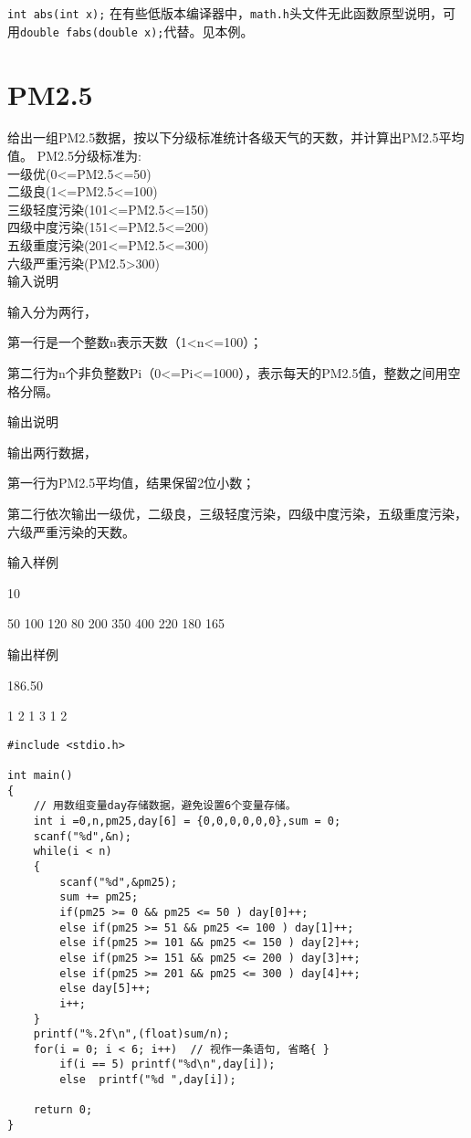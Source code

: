 \begin{note}[整数求绝对值函数]
	\lstinline|int abs(int x);| 在有些低版本编译器中，\lstinline|math.h|头文件无此函数原型说明，可用\lstinline|double fabs(double x);|代替。见本例。
\end{note}

\section{PM2.5}
给出一组PM2.5数据，按以下分级标准统计各级天气的天数，并计算出PM2.5平均值。
PM2.5分级标准为:\\
一级优(0<=PM2.5<=50)\\
二级良(1<=PM2.5<=100)\\
三级轻度污染(101<=PM2.5<=150)\\
四级中度污染(151<=PM2.5<=200)\\
五级重度污染(201<=PM2.5<=300)\\
六级严重污染(PM2.5>300)\\

输入说明
	
输入分为两行，

第一行是一个整数n表示天数（1<n<=100）；

第二行为n个非负整数Pi（0<=Pi<=1000），表示每天的PM2.5值，整数之间用空格分隔。

输出说明
	
输出两行数据，

第一行为PM2.5平均值，结果保留2位小数；

第二行依次输出一级优，二级良，三级轻度污染，四级中度污染，五级重度污染，六级严重污染的天数。

输入样例
	
10

50 100 120 80 200 350 400 220 180 165

输出样例	

186.50

1 2 1 3 1 2

\begin{lstlisting}
#include <stdio.h>

int main()
{
	// 用数组变量day存储数据，避免设置6个变量存储。
	int i =0,n,pm25,day[6] = {0,0,0,0,0,0},sum = 0;
	scanf("%d",&n);
	while(i < n) 
	{
		scanf("%d",&pm25);
		sum += pm25;
		if(pm25 >= 0 && pm25 <= 50 ) day[0]++;
		else if(pm25 >= 51 && pm25 <= 100 ) day[1]++;
		else if(pm25 >= 101 && pm25 <= 150 ) day[2]++;
		else if(pm25 >= 151 && pm25 <= 200 ) day[3]++;
		else if(pm25 >= 201 && pm25 <= 300 ) day[4]++;
		else day[5]++;
		i++;
	} 
	printf("%.2f\n",(float)sum/n);
	for(i = 0; i < 6; i++)  // 视作一条语句, 省略{ }
		if(i == 5) printf("%d\n",day[i]);
		else  printf("%d ",day[i]);
	
	return 0;
} 
\end{lstlisting}

